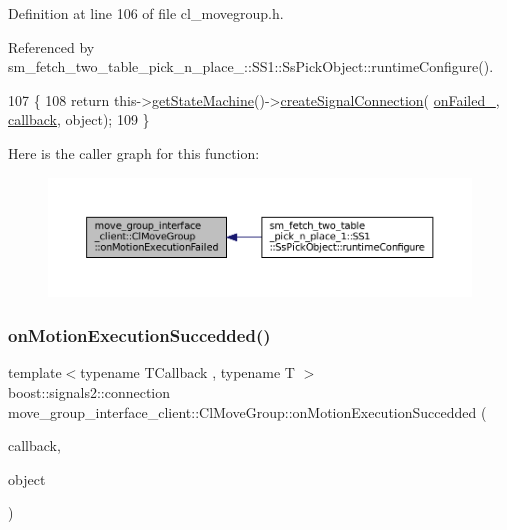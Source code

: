 Definition at line 106 of file cl\+\_\+movegroup.\+h.



Referenced by sm\+\_\+fetch\+\_\+two\+\_\+table\+\_\+pick\+\_\+n\+\_\+place\+\_\+::\+S\+S1\+::\+Ss\+Pick\+Object\+::runtime\+Configure().


\begin{DoxyCode}
107   \{
108     \textcolor{keywordflow}{return} this->\hyperlink{classsmacc_1_1ISmaccClient_aec51d4712404cb9882b86e4c854bb93a}{getStateMachine}()->\hyperlink{classsmacc_1_1ISmaccStateMachine_adf0f42ade0c65cc471960fe2a7c42da2}{createSignalConnection}(
      \hyperlink{classmove__group__interface__client_1_1ClMoveGroup_a793ac2c50a1d897afe14a8780940e8ce}{onFailed\_}, \hyperlink{sm__ridgeback__barrel__search__1_2servers_2opencv__perception__node_2opencv__perception__node_8cpp_a050e697bd654facce10ea3f6549669b3}{callback}, \textcolor{keywordtype}{object});
109   \}
\end{DoxyCode}
Here is the caller graph for this function\+:
\nopagebreak
\begin{figure}[H]
\begin{center}
\leavevmode
\includegraphics[width=350pt]{classmove__group__interface__client_1_1ClMoveGroup_a0729ef7e1ea6500f449ccdc2c3b0e3ec_icgraph}
\end{center}
\end{figure}
\mbox{\label{classmove__group__interface__client_1_1ClMoveGroup_a04f3cafe060033b66f3fac27f744a043}} 
\subsubsection{\texorpdfstring{on\+Motion\+Execution\+Succedded()}{onMotionExecutionSuccedded()}}
{\footnotesize\ttfamily template$<$typename T\+Callback , typename T $>$ \\
boost\+::signals2\+::connection move\+\_\+group\+\_\+interface\+\_\+client\+::\+Cl\+Move\+Group\+::on\+Motion\+Execution\+Succedded (\begin{DoxyParamCaption}\item[{T\+Callback}]{callback,  }\item[{T $\ast$}]{object }\end{DoxyParamCaption})\hspace{0.3cm}{\ttfamily [inline]}}



